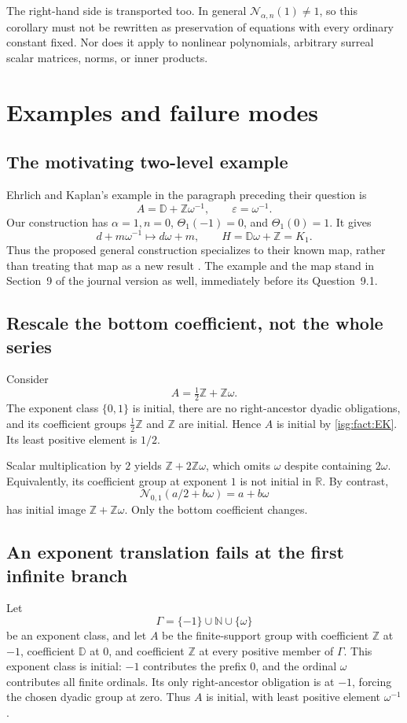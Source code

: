 \documentclass[11pt]{article}
\theoremstyle{definition}
\theoremstyle{remark}
\newcommand{\R}{\mathbb{R}}
\newcommand{\Z}{\mathbb{Z}}
\newcommand{\N}{\mathbb{N}}
\newcommand{\D}{\mathbb{D}}
\newcommand{\Rect}{\mathcal{N}_{\alpha,n}}
\begin{document}
The right-hand side is transported too. In general $\Rect(1)\ne1$,
so this corollary must not be rewritten as preservation of equations
with every ordinary constant fixed. Nor does it apply to nonlinear
polynomials, arbitrary surreal scalar matrices, norms, or inner products.

\section{Examples and failure modes}\label{isg:sec:examples}

\subsection{The motivating two-level example}
Ehrlich and Kaplan's example in the paragraph preceding their question
is
\[
 A=\D+\Z\omega^{-1},\qquad \varepsilon=\omega^{-1}.
\]
Our construction has $\alpha=1,n=0$, $\Theta_1(-1)=0$, and
$\Theta_1(0)=1$. It gives
\[
 d+m\omega^{-1}\longmapsto d\omega+m,
 \qquad H=\D\omega+\Z=K_1.
\]
Thus the proposed general construction specializes to their known map,
rather than treating that map as a new result \cite[Section~9]{EK}.
The example and the map stand in Section~9 of the journal version as
well, immediately before its Question~9.1.

\subsection{Rescale the bottom coefficient, not the whole series}
Consider
\[
 A=\tfrac12\Z+\Z\omega.
\]
The exponent class $\{0,1\}$ is initial, there are no right-ancestor
dyadic obligations, and its coefficient groups $\frac12\Z$ and $\Z$
are initial. Hence $A$ is initial by \cref{isg:fact:EK}. Its least positive
element is $1/2$.

Scalar multiplication by $2$ yields $\Z+2\Z\omega$, which omits
$\omega$ despite containing $2\omega$. Equivalently, its coefficient
group at exponent $1$ is not initial in $\R$. By contrast,
\[
 \mathcal N_{0,1}(a/2+b\omega)=a+b\omega
\]
has initial image $\Z+\Z\omega$. Only the bottom coefficient changes.

\subsection{An exponent translation fails at the first infinite branch}
Let
\[
 \Gamma=\{-1\}\cup\N\cup\{\omega\}
\]
be an exponent class, and let $A$ be the finite-support group with
coefficient $\Z$ at $-1$, coefficient $\D$ at $0$, and coefficient
$\Z$ at every positive member of $\Gamma$. This exponent class is
initial: $-1$ contributes the prefix $0$, and the ordinal $\omega$
contributes all finite ordinals. Its only right-ancestor obligation is
at $-1$, forcing the chosen dyadic group at zero. Thus $A$ is initial,
with least positive element $\omega^{-1}$.
\end{document}
